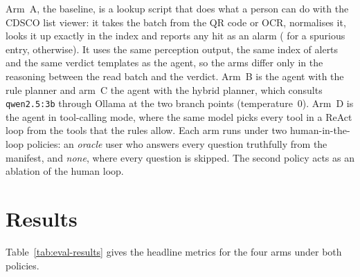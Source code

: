 Arm~A, the baseline, is a lookup script that does what a person can do with the CDSCO list viewer:
it takes the batch from the QR code or OCR, normalises it, looks it up exactly in the index and
reports any hit as an alarm (\SFAKE{} for a spurious entry, \FLAGGED{} otherwise). It uses the same
perception output, the same index of  alerts and the same verdict templates as
the agent, so the arms differ only in the reasoning between the read batch and the verdict. Arm~B is the agent with the rule planner and arm~C the agent with the
hybrid planner, which consults \texttt{qwen2.5:3b} through Ollama at the two branch points
(temperature~0). Arm~D is the agent in tool-calling mode, where the same model picks every tool in a ReAct loop from the
tools that the rules allow. Each arm runs under two human-in-the-loop policies: an \emph{oracle} user who
answers every question truthfully from the manifest, and \emph{none}, where every question is
skipped. The second policy acts as an ablation of the human loop.

\section{Results}
\label{sec:eval-results}

Table~\ref{tab:eval-results} gives the headline metrics for the four arms under both policies.

